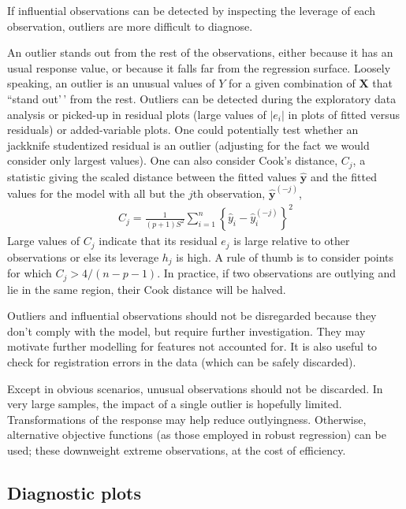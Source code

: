 \documentclass[
  11pt,
  letterpaper,
]{book}
\theoremstyle{definition}
\theoremstyle{definition}
\theoremstyle{definition}
\theoremstyle{definition}
\theoremstyle{remark}
\begin{document}
If influential observations can be detected by inspecting the leverage of each observation, outliers are more difficult to diagnose.

An outlier stands out from the rest of the observations, either because it has an usual response value, or because it falls far from the regression surface.
Loosely speaking, an outlier is an unusual values of \(Y\) for a given combination of \(\mathbf{X}\) that ``stand out'\,' from the rest.
Outliers can be detected during the exploratory data analysis or picked-up in residual plots (large values of \(|e_i|\) in plots of fitted versus residuals) or added-variable plots. One could potentially test whether an jackknife studentized residual is an outlier (adjusting for the fact we would consider only largest values). One can also consider Cook's distance, \(C_j\), a statistic giving the scaled distance between the fitted values \(\hat{\boldsymbol{y}}\) and the fitted values for the model with all but the \(j\)th observation, \(\hat{\boldsymbol{y}}^{(-j)}\),
\begin{align*}
C_j = \frac{1}{(p+1)S^2} \sum_{i=1}^n \left\{\hat{y}_i - \hat{y}_{i}^{(-j)}\right\}^2
\end{align*}
Large values of \(C_j\) indicate that its residual \(e_j\) is large relative to other observations or else its leverage \(h_j\) is high. A rule of thumb is to consider points for which \(C_j > 4/(n-p-1)\). In practice, if two observations are outlying and lie in the same region, their Cook distance will be halved.

Outliers and influential observations should not be disregarded because they don't comply with the model, but require further investigation. They may motivate further modelling for features not accounted for. It is also useful to check for registration errors in the data (which can be safely discarded).

Except in obvious scenarios, unusual observations should not be discarded. In very large samples, the impact of a single outlier is hopefully limited. Transformations of the response may help reduce outlyingness. Otherwise, alternative objective functions (as those employed in robust regression) can be used; these downweight extreme observations, at the cost of efficiency.

\hypertarget{diagnostic-plots}{%
\subsection{Diagnostic plots}\label{diagnostic-plots}}
\end{document}

